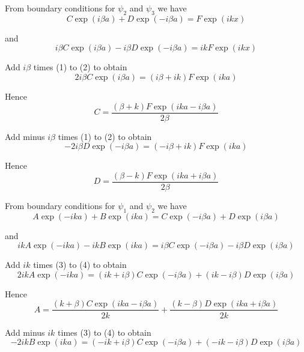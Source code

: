 From boundary conditions for $\psi_2$ and $\psi_3$ we have
\begin{equation*}
C\exp(i\beta a)+D\exp(-i\beta a)=F\exp(ikx)\tag{1}
\end{equation*}

and
\begin{equation*}
i\beta C\exp(i\beta a)-i\beta D\exp(-i\beta a)=ikF\exp(ikx)\tag{2}
\end{equation*}

Add $i\beta$ times (1) to (2) to obtain
\begin{equation*}
2i\beta C\exp(i\beta a)=(i\beta+ik)F\exp(ika)
\end{equation*}

Hence
\begin{equation*}
C=\frac{(\beta+k)F\exp(ika-i\beta a)}{2\beta}
\end{equation*}

Add minus $i\beta$ times (1) to (2) to obtain
\begin{equation*}
-2i\beta D\exp(-i\beta a)=(-i\beta+ik)F\exp(ika)
\end{equation*}

Hence
\begin{equation*}
D=\frac{(\beta-k)F\exp(ika+i\beta a)}{2\beta}
\end{equation*}

From boundary conditions for $\psi_1$ and $\psi_2$ we have
\begin{equation*}
A\exp(-ika)+B\exp(ika)=C\exp(-i\beta a)+D\exp(i\beta a)\tag{3}
\end{equation*}

and
\begin{equation*}
ikA\exp(-ika)-ikB\exp(ika)=i\beta C\exp(-i\beta a)-i\beta D\exp(i\beta a)\tag{4}
\end{equation*}

Add $ik$ times (3) to (4) to obtain
\begin{equation*}
2ikA\exp(-ika)=(ik+i\beta)C\exp(-i\beta a)+(ik-i\beta)D\exp(i\beta a)
\end{equation*}

Hence
\begin{equation*}
A=\frac{(k+\beta)C\exp(ika-i\beta a)}{2k}+\frac{(k-\beta)D\exp(ika+i\beta a)}{2k}
\end{equation*}

\iffalse

Add minus $ik$ times (3) to (4) to obtain
\begin{equation*}
-2ikB\exp(ika)=(-ik+i\beta)C\exp(-i\beta a)+(-ik-i\beta)D\exp(i\beta a)
\end{equation*}

